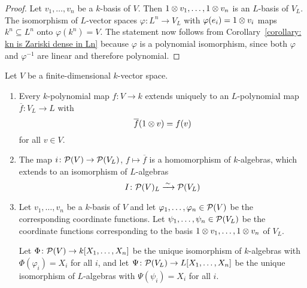 \begin{proof}
  Let $v_1, \dotsc, v_n$ be a $k$-basis of $V$.
  Then $1 \mathbin{\otimes} v_1, \dotsc, 1 \mathbin{\otimes} v_n$ is an $L$-basis of $V_L$.
  The isomorphism of $L$-vector spaces $\varphi \colon L^n \to V_L$ with $\varphi(e_i) = 1 \mathbin{\otimes} v_i$ maps $k^n \subseteq L^n$ onto $\varphi(k^n) = V$.
  The statement now follows from Corollary~\ref{corollary: kn is Zariski dense in Ln} because $\varphi$ is a polynomial isomorphism, since both $\varphi$ and $\varphi^{-1}$ are linear and therefore polynomial.
\end{proof}


\begin{proposition}
  \label{proposition: consistent choice of identification for polynomial functions}
  Let $V$ be a finite-dimensional $k$-vector space.
  \begin{enumerate}
    \item
      Every $k$-polynomial map $f \colon V \to k$ extends uniquely to an $L$-polynomial map $\overline{f} \colon V_L \to L$ with
      \[
          \overline{f}(1 \mathbin{\otimes} v)
        = f(v)
      \]
      for all $v \in V$.
    \item
      The map $i \colon \mathcal{P}(V) \to \mathcal{P}(V_L)$, $f \mapsto \overline{f}$ is a homomorphism of $k$-algebras, which extends to an isomorphism of $L$-algebras
      \[
                                I
        \colon                  \mathcal{P}(V)_L
        \xrightarrow{\,\sim\,}  \mathcal{P}(V_L)
      \]
    \item
      Let $v_1, \dotsc, v_n$ be a $k$-basis of $V$ and let $\varphi_1, \dotsc, \varphi_n \in \mathcal{P}(V)$ be the corresponding coordinate functions.
      Let $\psi_1, \dotsc, \psi_n \in \mathcal{P}(V_L)$ be the coordinate functions corresponding to the basis $1 \mathbin{\otimes} v_1, \dotsc, 1 \mathbin{\otimes} v_n$ of $V_L$.
      
      Let $\Phi \colon \mathcal{P}(V) \to k[X_1, \dotsc, X_n]$ be the unique isomorphism of $k$-algebras with $\Phi(\varphi_i) = X_i$ for all $i$, and let $\Psi \colon \mathcal{P}(V_L) \to L[X_1, \dotsc, X_n]$ be the unique isomorphism of $L$-algebras with $\Psi(\psi_i) = X_i$ for all $i$.
      

\end{enumerate}
\end{proposition}
